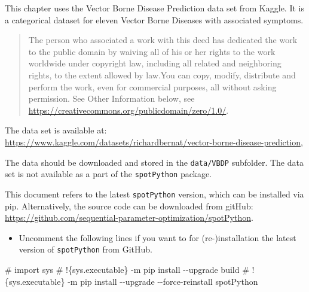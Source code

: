 \documentclass[
  letterpaper,
  DIV=11,
  numbers=noendperiod]{scrreprt}
\newenvironment{Shaded}{\begin{snugshade}}{\end{snugshade}}
\newcommand{\CommentTok}[1]{\textcolor[rgb]{0.37,0.37,0.37}{#1}}
\providecommand{\tightlist}{%
  \setlength{\itemsep}{0pt}\setlength{\parskip}{0pt}}\usepackage{longtable,booktabs,array}
\begin{document}
\begin{tcolorbox}[enhanced jigsaw, left=2mm, title=\textcolor{quarto-callout-important-color}{\faExclamation}\hspace{0.5em}{Vector Borne Disease Prediction Data Set}, titlerule=0mm, toprule=.15mm, leftrule=.75mm, colbacktitle=quarto-callout-important-color!10!white, colback=white, arc=.35mm, toptitle=1mm, bottomtitle=1mm, colframe=quarto-callout-important-color-frame, bottomrule=.15mm, rightrule=.15mm, breakable, coltitle=black, opacitybacktitle=0.6, opacityback=0]

This chapter uses the Vector Borne Disease Prediction data set from
Kaggle. It is a categorical dataset for eleven Vector Borne Diseases
with associated symptoms.

\begin{quote}
The person who associated a work with this deed has dedicated the work
to the public domain by waiving all of his or her rights to the work
worldwide under copyright law, including all related and neighboring
rights, to the extent allowed by law.You can copy, modify, distribute
and perform the work, even for commercial purposes, all without asking
permission. See Other Information below, see
\url{https://creativecommons.org/publicdomain/zero/1.0/}.
\end{quote}

The data set is available at:
\url{https://www.kaggle.com/datasets/richardbernat/vector-borne-disease-prediction},

The data should be downloaded and stored in the \texttt{data/VBDP}
subfolder. The data set is not available as a part of the
\texttt{spotPython} package.

\end{tcolorbox}

This document refers to the latest \texttt{spotPython} version, which
can be installed via pip. Alternatively, the source code can be
downloaded from gitHub:
\url{https://github.com/sequential-parameter-optimization/spotPython}.

\begin{itemize}
\tightlist
\item
  Uncomment the following lines if you want to for (re-)installation the
  latest version of \texttt{spotPython} from GitHub.
\end{itemize}

\begin{Shaded}
\begin{Highlighting}[]
\CommentTok{\# import sys}
\CommentTok{\# !\{sys.executable\} {-}m pip install {-}{-}upgrade build}
\CommentTok{\# !\{sys.executable\} {-}m pip install {-}{-}upgrade {-}{-}force{-}reinstall spotPython}
\end{Highlighting}
\end{Shaded}
\end{document}
